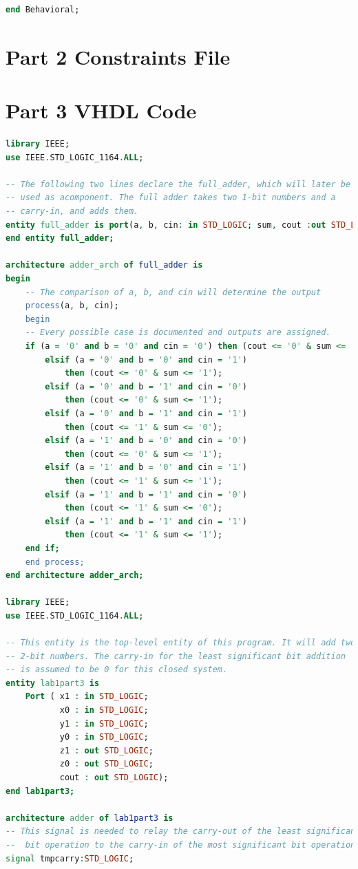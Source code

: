\documentclass[11pt]{article}
\begin{document}
\begin{appendices}
\begin{lstlisting}[language=VHDL]
end Behavioral;
\end{lstlisting}

\section{Part 2 Constraints File}

\section{Part 3 VHDL Code}

\begin{lstlisting}[language=VHDL]
library IEEE;
use IEEE.STD_LOGIC_1164.ALL;

-- The following two lines declare the full_adder, which will later be
-- used as acomponent. The full adder takes two 1-bit numbers and a 
-- carry-in, and adds them.
entity full_adder is port(a, b, cin: in STD_LOGIC; sum, cout :out STD_LOGIC);
end entity full_adder;

architecture adder_arch of full_adder is
begin
    -- The comparison of a, b, and cin will determine the output
    process(a, b, cin);
    begin
    -- Every possible case is documented and outputs are assigned.
    if (a = '0' and b = '0' and cin = '0') then (cout <= '0' & sum <= '0');
		elsif (a = '0' and b = '0' and cin = '1') 
			then (cout <= '0' & sum <= '1');
		elsif (a = '0' and b = '1' and cin = '0') 
			then (cout <= '0' & sum <= '1');
		elsif (a = '0' and b = '1' and cin = '1') 
			then (cout <= '1' & sum <= '0');
		elsif (a = '1' and b = '0' and cin = '0') 
			then (cout <= '0' & sum <= '1');
		elsif (a = '1' and b = '0' and cin = '1') 
			then (cout <= '1' & sum <= '1');
		elsif (a = '1' and b = '1' and cin = '0') 
			then (cout <= '1' & sum <= '0');
		elsif (a = '1' and b = '1' and cin = '1') 
			then (cout <= '1' & sum <= '1');
	end if;
	end process;
end architecture adder_arch;

library IEEE;
use IEEE.STD_LOGIC_1164.ALL;

-- This entity is the top-level entity of this program. It will add two 
-- 2-bit numbers. The carry-in for the least significant bit addition 
-- is assumed to be 0 for this closed system.
entity lab1part3 is
    Port ( x1 : in STD_LOGIC;
           x0 : in STD_LOGIC;
           y1 : in STD_LOGIC;
           y0 : in STD_LOGIC;
           z1 : out STD_LOGIC;
           z0 : out STD_LOGIC;
           cout : out STD_LOGIC);
end lab1part3;

architecture adder of lab1part3 is
-- This signal is needed to relay the carry-out of the least significant
--  bit operation to the carry-in of the most significant bit operation.
signal tmpcarry:STD_LOGIC;


\end{lstlisting}
\end{appendices}
\end{document}
